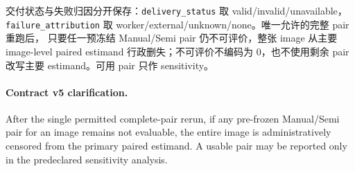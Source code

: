 交付状态与失败归因分开保存：\texttt{delivery\_status} 取 valid/invalid/unavailable，
\texttt{failure\_attribution} 取 worker/external/unknown/none。唯一允许的完整 pair 重跑后，
只要任一预冻结 Manual/Semi pair 仍不可评价，整张 image 从主要 image-level paired estimand
行政删失；不可评价不编码为 0，也不使用剩余 pair 改写主要 estimand。可用 pair 只作 sensitivity。

\paragraph{Contract v5 clarification.}
After the single permitted complete-pair rerun, if any pre-frozen Manual/Semi pair for an image remains not evaluable, the entire image is administratively censored from the primary paired estimand. A usable pair may be reported only in the predeclared sensitivity analysis.
